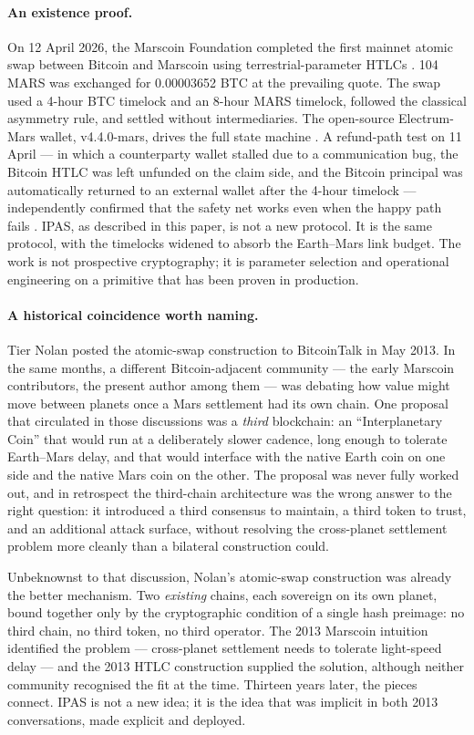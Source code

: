 \documentclass[11pt]{article}
\begin{document}
\paragraph{An existence proof.}
On 12 April 2026, the Marscoin Foundation completed the first mainnet atomic swap between Bitcoin and Marscoin using terrestrial-parameter HTLCs \citep{marscoin2026firstswap}. 104 MARS was exchanged for 0.00003652 BTC at the prevailing quote. The swap used a 4-hour BTC timelock and an 8-hour MARS timelock, followed the classical asymmetry rule, and settled without intermediaries. The open-source Electrum-Mars wallet, v4.4.0-mars, drives the full state machine \citep{marscoin2026electrum}. A refund-path test on 11 April --- in which a counterparty wallet stalled due to a communication bug, the Bitcoin HTLC was left unfunded on the claim side, and the Bitcoin principal was automatically returned to an external wallet after the 4-hour timelock --- independently confirmed that the safety net works even when the happy path fails \citep{marscoin2026firstswap}. IPAS, as described in this paper, is not a new protocol. It is the same protocol, with the timelocks widened to absorb the Earth--Mars link budget. The work is not prospective cryptography; it is parameter selection and operational engineering on a primitive that has been proven in production.

\paragraph{A historical coincidence worth naming.}
Tier Nolan posted the atomic-swap construction to BitcoinTalk in May 2013. In the same months, a different Bitcoin-adjacent community --- the early Marscoin contributors, the present author among them --- was debating how value might move between planets once a Mars settlement had its own chain. One proposal that circulated in those discussions was a \emph{third} blockchain: an ``Interplanetary Coin'' that would run at a deliberately slower cadence, long enough to tolerate Earth--Mars delay, and that would interface with the native Earth coin on one side and the native Mars coin on the other. The proposal was never fully worked out, and in retrospect the third-chain architecture was the wrong answer to the right question: it introduced a third consensus to maintain, a third token to trust, and an additional attack surface, without resolving the cross-planet settlement problem more cleanly than a bilateral construction could.

Unbeknownst to that discussion, Nolan's atomic-swap construction was already the better mechanism. Two \emph{existing} chains, each sovereign on its own planet, bound together only by the cryptographic condition of a single hash preimage: no third chain, no third token, no third operator. The 2013 Marscoin intuition identified the problem --- cross-planet settlement needs to tolerate light-speed delay --- and the 2013 HTLC construction supplied the solution, although neither community recognised the fit at the time. Thirteen years later, the pieces connect. IPAS is not a new idea; it is the idea that was implicit in both 2013 conversations, made explicit and deployed.
\end{document}

